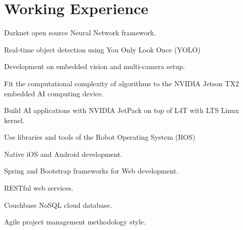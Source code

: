 \documentclass[]{resume}
\begin{document}
\begin{minipage}[t]{0.66\textwidth} 	
\section{Working Experience}

 
	\vspace{\topsep} %
	\begin{tightemize}

	\item Darknet open source Neural Network framework.
	\item Real-time object detection using You Only Look Once (YOLO)
	\item Development on embedded vision and multi-camera setup.
	\item Fit the computational complexity of algorithms to the NVIDIA Jetson TX2 embedded AI computing device.
	\item Build AI applications with NVIDIA JetPack on top of L4T with LTS Linux kernel.
	\item Use libraries and tools of the Robot Operating System (ROS)

	\end{tightemize}
	\sectionsep

 
	\begin{tightemize}

	\item Native iOS and Android development.
	\item Spring and Bootstrap frameworks for Web development.
	\item RESTful web services.
	\item Couchbase NoSQL cloud database.
	\item Agile project management methodology style.

	\end{tightemize}
	\sectionsep


\end{minipage}
\end{document}
